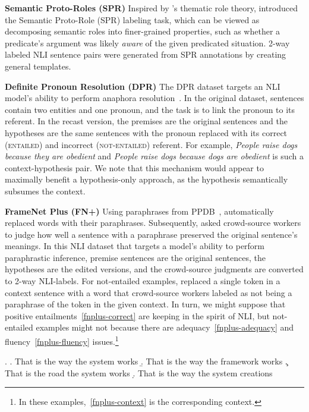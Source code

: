 \begin{datalist}
\item[] \textbf{Semantic Proto-Roles (SPR)} Inspired by 's thematic role theory, 
introduced the Semantic Proto-Role (SPR) labeling task, which can be viewed as decomposing semantic roles into finer-grained properties, such as whether a predicate's argument was likely \emph{aware} of the given predicated situation. 2-way labeled NLI sentence pairs were generated from SPR annotations by creating general templates.  


\item[] \textbf{Definite Pronoun Resolution (DPR)} The DPR dataset targets an NLI model's ability to perform anaphora resolution~\cite{rahman-ng:2012:EMNLP-CoNLL}. In the original dataset, sentences contain two entities and one pronoun, and the task is to link the pronoun to its referent. In the recast version, the premises are the original sentences and the hypotheses are the same sentences with the pronoun replaced with its correct (\textsc{entailed}) and incorrect (\textsc{not-entailed}) referent. For example, 
\textit{People raise dogs because they are obedient} and \textit{People raise dogs because dogs are obedient} is such a context-hypothesis pair. We note that this mechanism would appear to maximally benefit a hypothesis-only approach, as the hypothesis semantically subsumes the context.

\item[] \textbf{FrameNet Plus (FN+)} Using paraphrases from PPDB~\cite{ganitkevitch2013ppdb}, 
automatically replaced words with their paraphrases. Subsequently,
 asked crowd-source workers to judge how well a sentence with a paraphrase preserved the original sentence's meanings. In this NLI dataset that targets a model's ability to perform paraphrastic inference, premise sentences are the original sentences, the hypotheses are the edited versions, and the crowd-source judgments are converted to 2-way NLI-labels. For not-entailed examples,  replaced a single token in a context sentence with a word that crowd-source workers labeled as not being a paraphrase of the token in the given context. In turn, we might suppose that positive entailments~\ref{fnplus-correct} are keeping in the spirit of NLI, but not-entailed examples might not because there are adequacy~\ref{fnplus-adequacy} and fluency~\ref{fnplus-fluency} issues.\footnote{In these examples,~\ref{fnplus-context} is the corresponding context.}

\ex.
\a. That is the way the system works
\label{fnplus-context}
\b. That is the way the framework works
\label{fnplus-correct}
\c. That is the road the system works 
\label{fnplus-adequacy}
\d. That is the way the system creations
\label{fnplus-fluency}

\end{datalist}

